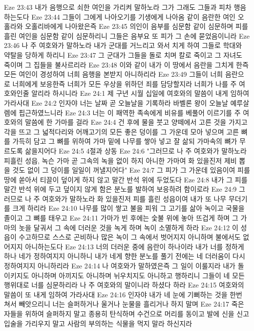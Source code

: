 Eze 23:43  내가 음행으로 쇠한 여인을 가리켜 말하노라 그가 그래도 그들과 피차 행음하는도다
Eze 23:44  그들이 그에게 나아오기를 기생에게 나아옴 같이 음란한 여인 오홀라와 오홀리바에게 나아왔은즉
Eze 23:45  의인이 음부를 심문함 같이 심문하며 피를 흘린 여인을 심문함 같이 심문하리니 그들은 음부요 또 피가 그 손에 묻었음이니라
Eze 23:46  나 주 여호와가 말하노라 내가 군대를 거느리고 와서 치게 하여 그들로 학대와 약탈을 당하게 하리니
Eze 23:47  그 군대가 그들을 돌로 치며 칼로 죽이고 그 자녀도 죽이며 그 집들을 불사르리라
Eze 23:48  이와 같이 내가 이 땅에서 음란을 그치게 한즉 모든 여인이 경성하여 너희 음행을 본받지 아니하리라
Eze 23:49  그들이 너희 음란으로 너희에게 보응한즉 너희가 모든 우상을 위하던 죄를 담당할지라 너희가 나를 주 여호와인줄 알리라 하시니라
Eze 24:1  제 구년 시월 십일에 여호와의 말씀이 내게 임하여 가라사대
Eze 24:2  인자야 너는 날짜 곧 오늘날을 기록하라 바벨론 왕이 오늘날 예루살렘에 핍근하였느니라
Eze 24:3  너는 이 패역한 족속에게 비유를 베풀어 이르기를 주 여호와의 말씀에 한 가마를 걸라
Eze 24:4  건 후에 물을 붓고 양떼에서 고른 것을 가지고 각을 뜨고 그 넓적다리와 어깨고기의 모든 좋은 덩이를 그 가운데 모아 넣으며 고른 뼈를 가득히 담고 그 뼈를 위하여 가마 밑에 나무를 쌓아 넣고 잘 삶되 가마속의 뼈가 무르도록 삶을지어다
Eze 24:5  4절과 상동
Eze 24:6  "그러므로 나 주 여호와가 말하노라 피흘린 성읍, 녹슨 가마 곧 그속의 녹을 없이 하지 아니한 가마여 화 있을진저 제비 뽑을 것도 없이 그 덩이를 일일이 꺼낼지어다"
Eze 24:7  그 피가 그 가운데 있음이여 피를 땅에 쏟아서 티끌이 덮이게 하지 않고 말간 반석 위에 두었도다
Eze 24:8  내가 그 피를 말간 반석 위에 두고 덮이지 않게 함은 분노를 발하여 보응하려 함이로라
Eze 24:9  그러므로 나 주 여호와가 말하노라 화 있을진저 피를 흘린 성읍이여 내가 또 나무 무더기를 크게 하리라
Eze 24:10  나무를 많이 쌓고 불을 피워 그 고기를 삶아 녹이고 국물을 졸이고 그 뼈를 태우고
Eze 24:11  가마가 빈 후에는 숯불 위에 놓아 뜨겁게 하며 그 가마의 놋을 달궈서 그 속에 더러운 것을 녹게 하며 녹이 소멸하게 하라
Eze 24:12  이 성읍이 수고하므로 스스로 곤비하나 많은 녹이 그 속에서 벗어지지 아니하며 불에서도 없어지지 아니하는도다
Eze 24:13  너의 더러운 중에 음란이 하나이라 내가 너를 정하게 하나 네가 정하여지지 아니하니 내가 네게 향한 분노를 풀기 전에는 네 더러움이 다시 정하여지지 아니하리라
Eze 24:14  나 여호와가 말하였은즉 그 일이 이룰지라 내가 돌이키지도 아니하며 아끼지도 아니하며 뉘우치지도 아니하고 행하리니 그들이 네 모든 행위대로 너를 심문하리라 나 주 여호와의 말이니라 하셨다 하라
Eze 24:15  여호와의 말씀이 또 내게 임하여 가라사대
Eze 24:16  인자야 내가 네 눈에 기뻐하는 것을 한번 쳐서 빼앗으리니 너는 슬퍼하거나 울거나 눈물을 흘리거나 하지 말며
Eze 24:17  죽은 자들을 위하여 슬퍼하지 말고 종용히 탄식하며 수건으로 머리를 동이고 발에 신을 신고 입술을 가리우지 말고 사람의 부의하는 식물을 먹지 말라 하신지라
